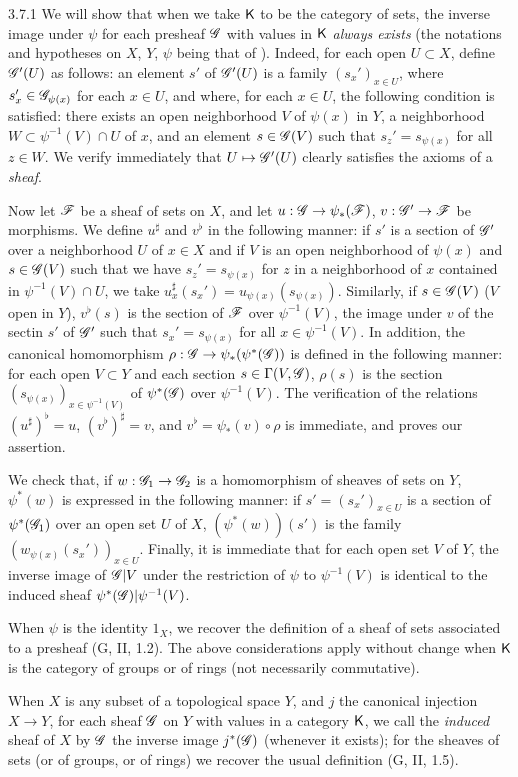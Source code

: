 \begin{env}{3.7.1}
\label{env-0.3.7.1}
We will show that when we take $\mathsf{K}$ to be the category of sets, the inverse image under
$\psi$ for each presheaf $\mathscr{G}$ with values in $\mathsf{K}$ \emph{always exists} (the notations
and hypotheses on $X$, $Y$, $\psi$ being that of ). Indeed, for each open
$U\subset X$, define $\mathscr{G}'(U)$ as follows: an element $s'$ of $\mathscr{G}'(U)$ is a family
$(s_x')_{x\in U}$, where $s_x'\in\mathscr{G}_{\psi(x)}$ for each $x\in U$, and where, for each
$x\in U$, the following condition is satisfied: there exists an open neighborhood $V$ of
$\psi(x)$ in $Y$, a neighborhood $W\subset\psi^{-1}(V)\cap U$ of $x$, and an element
$s\in\mathscr{G}(V)$ such that $s_z'=s_{\psi(x)}$ for all $z\in W$. We verify immediately that
$U\mapsto\mathscr{G}'(U)$ clearly satisfies the axioms of a \emph{sheaf}.

Now let $\mathscr{F}$ be a sheaf of sets on $X$, and let $u:\mathscr{G}\to\psi_*(\mathscr{F})$,
$v:\mathscr{G}'\to\mathscr{F}$ be morphisms. We define $u^\sharp$ and $v^\flat$ in the following
manner: if $s'$ is a section of $\mathscr{G}'$ over a neighborhood $U$ of $x\in X$ and if $V$ is
an open neighborhood of $\psi(x)$ and $s\in\mathscr{G}(V)$ such that we have $s_z'=s_{\psi(x)}$
for $z$ in a neighborhood of $x$ contained in $\psi^{-1}(V)\cap U$, we take
$u_x^\sharp(s_x')=u_{\psi(x)}(s_{\psi(x)})$. Similarly, if $s\in\mathscr{G}(V)$ ($V$ open in $Y$),
$v^\flat(s)$ is the section of $\mathscr{F}$ over $\psi^{-1}(V)$, the image under $v$ of the
sectin $s'$ of $\mathscr{G}'$ such that $s_x'=s_{\psi(x)}$ for all $x\in\psi^{-1}(V)$. In
addition, the canonical homomorphism  $\rho:\mathscr{G}\to\psi_*(\psi^*(\mathscr{G}))$
is defined in the following manner: for each open $V\subset Y$ and each section
$s\in\Gamma(V,\mathscr{G})$, $\rho(s)$ is the section $(s_{\psi(x)})_{x\in\psi^{-1}(V)}$ of
$\psi^*(\mathscr{G})$ over $\psi^{-1}(V)$. The verification of the relations $(u^\sharp)^\flat=u$,
$(v^\flat)^\sharp=v$, and $v^\flat=\psi_*(v)\circ\rho$ is immediate, and proves our
assertion.

We check that, if $w:\mathscr{G}_1\to\mathscr{G}_2$ is a homomorphism of sheaves of sets on $Y$,
$\psi^*(w)$ is expressed in the following manner: if $s'=(s_x')_{x\in U}$ is a section of
$\psi^*(\mathscr{G}_1)$ over an open set $U$ of $X$, $(\psi^*(w))(s')$ is the family
$(w_{\psi(x)}(s_x'))_{x\in U}$. Finally, it is immediate that for each open set $V$ of $Y$,
the inverse image of $\mathscr{G}|V$ under the restriction of $\psi$ to $\psi^{-1}(V)$ is
identical to the induced sheaf $\psi^*(\mathscr{G})|\psi^{-1}(V)$.

When $\psi$ is the identity $1_X$, we recover the definition of a sheaf of sets associated
to a presheaf (G, II, 1.2). The above considerations apply without change when $\mathsf{K}$ is the
category of groups or of rings (not necessarily commutative).

When $X$ is any subset of a topological space $Y$, and $j$ the canonical injection $X\to Y$,
for each sheaf $\mathscr{G}$ on $Y$ with values in a category $\mathsf{K}$, we call the \emph{induced}
sheaf of $X$ by $\mathscr{G}$ the inverse image $j^*(\mathscr{G})$ (whenever it exists); for the
sheaves of sets (or of groups, or of rings) we recover the usual definition (G, II, 1.5).
\end{env}

